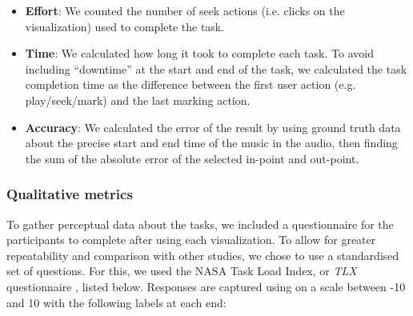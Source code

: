 \begin{itemize}
  \item \textbf{Effort}: We counted the number of seek actions (i.e. clicks on the visualization) used to complete the
    task.
  \item \textbf{Time}: We calculated how long it took to complete each task. To avoid including ``downtime'' at the
    start and end of the task, we calculated the task completion time as the difference between the first user action
    (e.g.  play/seek/mark) and the last marking action.
  \item \textbf{Accuracy}: We calculated the error of the result by using ground truth data about the precise start and
    end time of the music in the audio, then finding the sum of the absolute error of the selected in-point and
    out-point.
\end{itemize}

\subsubsection{Qualitative metrics}

To gather perceptual data about the tasks, we included a questionnaire for the participants to complete after using
each visualization. To allow for greater repeatability and comparison with other studies, we chose to use a
standardised set of questions. For this, we used the NASA Task Load Index, or \textit{TLX} questionnaire
\citep{Hart1988}, listed below.  Responses are captured using on a scale between -10 and 10 with the following labels
at each end:


